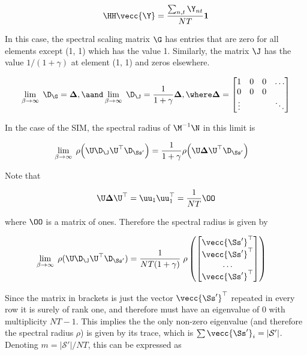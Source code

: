 $$
\HH \vecc{\Y} = \frac{\sum_{n, t} \Y_{nt}}{NT} \mathbf{1}
$$


In this case, the spectral scaling matrix $\G$ has entries that are zero for all elements except (1, 1) which has the value 1. Similarly, the matrix $\J$ has the value $1 / (1 + \gamma)$ at element (1, 1) and zeros elsewhere. 


$$
\lim_{\beta \rightarrow \infty} \; \D_\G = \mathbf{\Delta}, \aand \lim_{\beta \rightarrow \infty} \; \D_\J = \frac{1}{1 + \gamma} \mathbf{\Delta}, \where     \mathbf{\Delta} = \begin{bmatrix}
    1 & 0 & 0 & \dots \\
    0 & 0 & 0 &  \\
    \vdots & & & \ddots
\end{bmatrix} 
$$

 In the case of the SIM, the spectral radius of $\M^{-1}\N$ in this limit is 

\begin{align*}
    \lim_{\beta \rightarrow \infty} \; \rho\Big(\U \D_\J \U^\top \D_{\Ss'} \Big) &= \frac{1}{1 + \gamma} \rho\Big(\U \mathbf{\Delta} \U^\top \D_{\Ss'} \Big)
\end{align*}

Note that 

\begin{equation*}
    \U \mathbf{\Delta} \U^\top = \uu_1 \uu_1^\top  = \frac{1}{NT} \OO
\end{equation*}

where $ \OO$ is a matrix of ones. Therefore the spectral radius is given by 

\begin{align*}
    \lim_{\beta \rightarrow \infty} \; \rho(\U \D_\J \U^\top \D_{\Ss'}) &= \frac{1}{NT (1 + \gamma) } \; \rho \left( \begin{bmatrix}
        \vecc{\Ss'}^\top \\ \vecc{\Ss'}^\top \\ \dots \\ \vecc{\Ss'}^\top
    \end{bmatrix} \right)
\end{align*}

Since the matrix in brackets is just the vector $\vecc{\Ss'}^\top$ repeated in every row it is surely of rank one, and therefore must have an eigenvalue of 0 with multiplicity $NT - 1$. This implies the the only non-zero eigenvalue (and therefore the spectral radius $\rho$) is given by its trace, which is $\sum \vecc{\Ss'}_i = |\mathcal{S}'|$. Denoting  $m=|\mathcal{S}'|/NT$, this can be expressed as 

